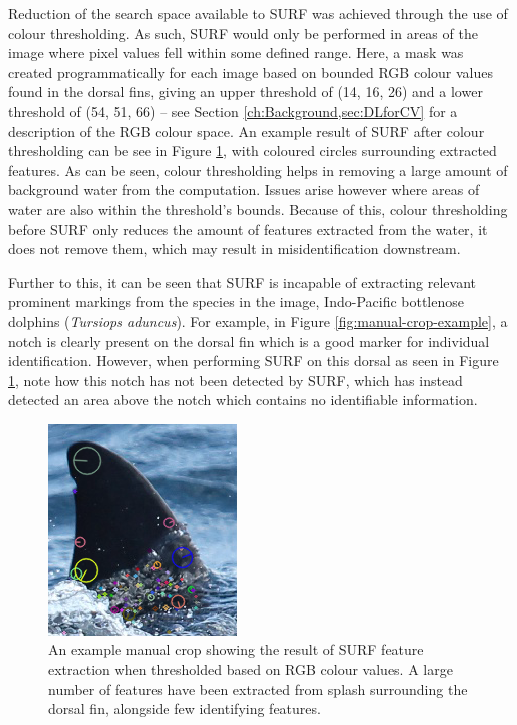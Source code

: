 Reduction of the search space available to SURF was achieved through the use of colour thresholding. As such, SURF would only be performed in areas of the image where pixel values fell within some defined range. Here, a mask was created programmatically for each image based on bounded RGB colour values found in the dorsal fins, giving an upper threshold of (14, 16, 26) and a lower threshold of (54, 51, 66) -- see Section \ref{ch:Background,sec:DLforCV} for a description of the RGB colour space. An example result of SURF after colour thresholding can be see in Figure \ref{fig:manual-crop-surf-colour-thresholding-example}, with coloured circles surrounding extracted features. As can be seen, colour thresholding helps in removing a large amount of background water from the computation. Issues arise however where areas of water are also within the threshold's bounds. Because of this, colour thresholding before SURF only reduces the amount of features extracted from the water, it does not remove them, which may result in misidentification downstream.

Further to this, it can be seen that SURF is incapable of extracting relevant prominent markings from the species in the image, Indo-Pacific bottlenose dolphins (\textit{Tursiops aduncus}). For example, in Figure \ref{fig:manual-crop-example}, a notch is clearly present on the dorsal fin which is a good marker for individual identification. However, when performing SURF on this dorsal as seen in Figure \ref{fig:manual-crop-surf-colour-thresholding-example}, note how this notch has not been detected by SURF, which has instead detected an area above the notch which contains no identifiable information. 

\begin{figure}
	\begin{center}
		\includegraphics[scale=0.6]{Chapter3/figs/manual-crop-surf-colour-thresholding.png}
	\end{center}
	\caption[An example manual crop showing the result of SURF feature extraction when thresholded based on RGB colour values.]{An example manual crop showing the result of SURF feature extraction when thresholded based on RGB colour values. A large number of features have been extracted from splash surrounding the dorsal fin, alongside few identifying features.
	}
	\label{fig:manual-crop-surf-colour-thresholding-example}
\end{figure}

